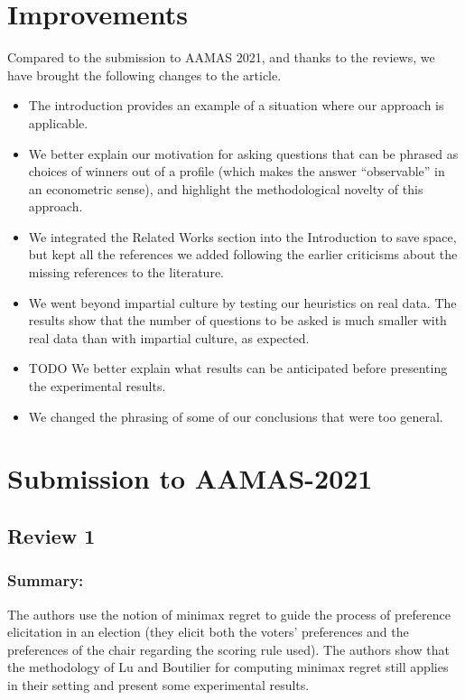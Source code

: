 \documentclass[version=3.21, pagesize, twoside=off, bibliography=totoc, DIV=calc, fontsize=12pt, a4paper]{scrartcl}
\begin{document}
\section{Improvements}
Compared to the submission to AAMAS 2021, and thanks to the reviews, we have brought the following changes to the article.

\begin{itemize}
	\item The introduction provides an example of a situation where our approach is applicable.
	\item We better explain our motivation for asking questions that can be phrased as choices of winners out of a profile (which makes the answer “observable” in an econometric sense), and highlight the methodological novelty of this approach.
	\item We integrated the Related Works section into the Introduction to save space, but kept all the references we added following the earlier criticisms about the missing references to the literature.
	\item We went beyond impartial culture by testing our heuristics on real data. The results show that the number of questions to be asked is much smaller with real data than with impartial culture, as expected.
	\item TODO We better explain what results can be anticipated before presenting the experimental results.
	\item We changed the phrasing of some of our conclusions that were too general.
\end{itemize}

\section{Submission to AAMAS-2021}
\subsection{Review 1}
\subsubsection*{Summary:}	The authors use the notion of minimax regret to guide the process of preference elicitation in an election (they elicit both the voters' preferences and the preferences of the chair regarding the scoring rule used). The authors show that the methodology of Lu and Boutilier for computing minimax regret still applies in their setting and present some experimental results.
\end{document}
